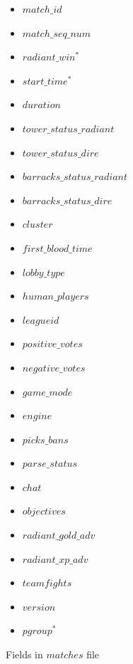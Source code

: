 \begin{figure}[h]
  \centering
    \caption{Fields in $matches$ file}
    \label{fig:matchesFile}
    \begin{mdframed}
        \begin{multicols}{2}
            \begin{itemize}
                \item $match\_id$
                \item $match\_seq\_num$
                \item $radiant\_win ^{*}$
                \item $start\_time ^{*}$
                \item $duration$
                \item $tower\_status\_radiant$
                \item $tower\_status\_dire$
                \item $barracks\_status\_radiant$
                \item $barracks\_status\_dire$
                \item $cluster$
                \item $first\_blood\_time$
                \item $lobby\_type$
                \item $human\_players$
                \item $leagueid$
                \item $positive\_votes$
                \item $negative\_votes$
                \item $game\_mode$
                \item $engine$
                \item $picks\_bans$
                \item $parse\_status$
                \item $chat$
                \item $objectives$
                \item $radiant\_gold\_adv$
                \item $radiant\_xp\_adv$
                \item $teamfights$
                \item $version$
                \item $pgroup ^{*}$
            \end{itemize}
        \end{multicols}
    \end{mdframed}
\end{figure}

